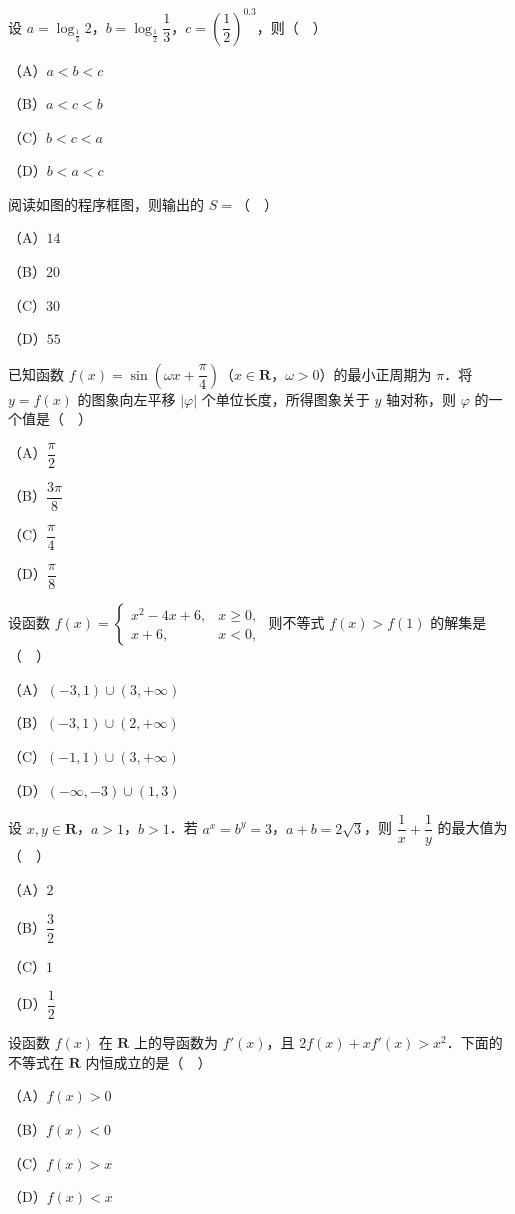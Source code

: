 \begin{question}
设 $a=\log_{\frac13}2$，$b=\log_{\frac12}\dfrac13$，$c=\left(\dfrac12\right)^{0.3}$，则（　）

（A）$a<b<c$

（B）$a<c<b$

（C）$b<c<a$

（D）$b<a<c$

\Needspace{0.4\textheight}
\end{question}
\begin{question}
阅读如图的程序框图，则输出的 $S=$（　）
\nopagebreak[4]
\begin{center}\end{center}
\nopagebreak[4]
（A）$14$

（B）$20$

（C）$30$

（D）$55$

\end{question}
\begin{question}
已知函数 $f(x)=\sin\left(\omega x+\dfrac{\pi}{4}\right)$（$x\in\mathbf R$，$\omega>0$）的最小正周期为 $\pi$．将 $y=f(x)$ 的图象向左平移 $|\varphi|$ 个单位长度，所得图象关于 $y$ 轴对称，则 $\varphi$ 的一个值是（　）

（A）$\dfrac{\pi}{2}$

（B）$\dfrac{3\pi}{8}$

（C）$\dfrac{\pi}{4}$

（D）$\dfrac{\pi}{8}$

\end{question}
\begin{question}
设函数 $f(x)=\begin{cases}x^2-4x+6,&x\geqslant0,\\ x+6,&x<0,\end{cases}$ 则不等式 $f(x)>f(1)$ 的解集是（　）

（A）$(-3,1)\cup(3,+\infty)$

（B）$(-3,1)\cup(2,+\infty)$

（C）$(-1,1)\cup(3,+\infty)$

（D）$(-\infty,-3)\cup(1,3)$

\end{question}
\begin{question}
设 $x,y\in\mathbf R$，$a>1$，$b>1$．若 $a^x=b^y=3$，$a+b=2\sqrt3$，则 $\dfrac1x+\dfrac1y$ 的最大值为（　）

（A）$2$

（B）$\dfrac32$

（C）$1$

（D）$\dfrac12$

\end{question}
\begin{question}
设函数 $f(x)$ 在 $\mathbf R$ 上的导函数为 $f'(x)$，且 $2f(x)+xf'(x)>x^2$．下面的不等式在 $\mathbf R$ 内恒成立的是（　）

（A）$f(x)>0$

（B）$f(x)<0$

（C）$f(x)>x$

（D）$f(x)<x$

\end{question}

